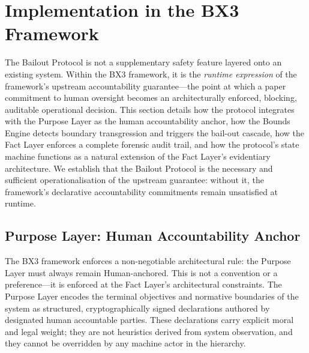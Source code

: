 
\section{Implementation in the BX3 Framework}
\label{sec:bailout-implementation}

The Bailout Protocol is not a supplementary safety feature layered onto an existing system. Within the BX3 framework, it is the \emph{runtime expression} of the framework's upstream accountability guarantee---the point at which a paper commitment to human oversight becomes an architecturally enforced, blocking, auditable operational decision. This section details how the protocol integrates with the Purpose Layer as the human accountability anchor, how the Bounds Engine detects boundary transgression and triggers the bail-out cascade, how the Fact Layer enforces a complete forensic audit trail, and how the protocol's state machine functions as a natural extension of the Fact Layer's evidentiary architecture. We establish that the Bailout Protocol is the necessary and sufficient operationalisation of the upstream guarantee: without it, the framework's declarative accountability commitments remain unsatisfied at runtime.

\subsection{Purpose Layer: Human Accountability Anchor}
\label{sec:purpose-layer-anchor}

The BX3 framework enforces a non-negotiable architectural rule: the Purpose Layer must always remain Human-anchored. This is not a convention or a preference---it is enforced at the Fact Layer's architectural constraints. The Purpose Layer encodes the terminal objectives and normative boundaries of the system as structured, cryptographically signed declarations authored by designated human accountable parties. These declarations carry explicit moral and legal weight; they are not heuristics derived from system observation, and they cannot be overridden by any machine actor in the hierarchy.

